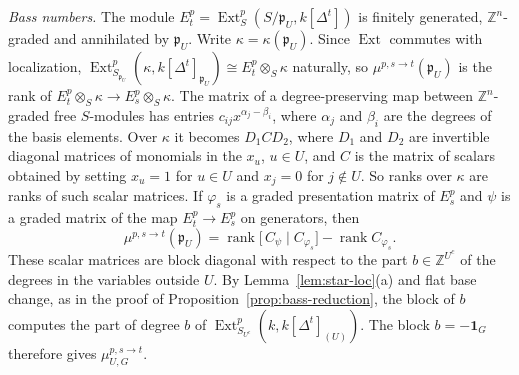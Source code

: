 \documentclass[11pt]{article}
\theoremstyle{plain}
\theoremstyle{definition}
\begin{document}
\emph{Bass numbers.} The module $E^p_t=\operatorname{Ext}^p_S(S/\mathfrak{p}_U,k[\Delta^t])$ is finitely generated, $\mathbb{Z}^n$-graded and annihilated by $\mathfrak{p}_U$. Write $\kappa=\kappa(\mathfrak{p}_U)$. Since $\operatorname{Ext}$ commutes with localization, $\operatorname{Ext}^p_{S_{\mathfrak{p}_U}}(\kappa,k[\Delta^t]_{\mathfrak{p}_U})\cong E^p_t\otimes_S\kappa$ naturally, so $\mu^{p,s\to t}(\mathfrak{p}_U)$ is the rank of $E^p_t\otimes_S\kappa\to E^p_s\otimes_S\kappa$. The matrix of a degree-preserving map between $\mathbb{Z}^n$-graded free $S$-modules has entries $c_{ij}x^{\alpha_j-\beta_i}$, where $\alpha_j$ and $\beta_i$ are the degrees of the basis elements. Over $\kappa$ it becomes $D_1CD_2$, where $D_1$ and $D_2$ are invertible diagonal matrices of monomials in the $x_u$, $u\in U$, and $C$ is the matrix of scalars obtained by setting $x_u=1$ for $u\in U$ and $x_j=0$ for $j\notin U$. So ranks over $\kappa$ are ranks of such scalar matrices. If $\varphi_s$ is a graded presentation matrix of $E^p_s$ and $\psi$ is a graded matrix of the map $E^p_t\to E^p_s$ on generators, then
\[
 \mu^{p,s\to t}(\mathfrak{p}_U)=\operatorname{rank}\bigl[\,C_\psi\mid C_{\varphi_s}\bigr]-\operatorname{rank}C_{\varphi_s}.
\]
These scalar matrices are block diagonal with respect to the part $b\in\mathbb{Z}^{U^c}$ of the degrees in the variables outside $U$. By Lemma~\ref{lem:star-loc}(a) and flat base change, as in the proof of Proposition~\ref{prop:bass-reduction}, the block of $b$ computes the part of degree $b$ of $\operatorname{Ext}^p_{S_{U^c}}(k,k[\Delta^t]_{(U)})$. The block $b=-\mathbf 1_G$ therefore gives $\mu^{p,s\to t}_{U,G}$.
\end{document}
